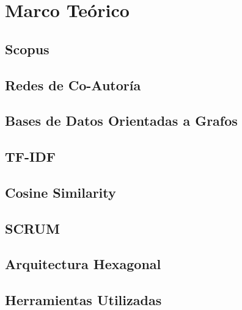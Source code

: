 \section{Marco Teórico}
\label{chapter01-section03:marcoTeorico}

\subsection{Scopus}
\label{chapter01-section03:Scopus}


\subsection{Redes de Co-Autoría}
\label{chapter01-section03:Redes de Co-Autoria}


\subsection{Bases de Datos Orientadas a Grafos}
\label{Chapter01-section3:Bases de datos orientadas a grados}


\subsection{TF-IDF}
\label{Chapter01-section3:TD-IDF}


\subsection{Cosine Similarity}
\label{Chapter01-section3:Cosine Similarity}


\subsection{SCRUM}
\label{Chapter01-section3:SCRUM}



\subsection{Arquitectura Hexagonal}
\label{Chapter01-section3:Arquitectura Hexagonal}


\subsection{Herramientas Utilizadas}
\label{Chapter01-section3:Herramientas utilizadas}

